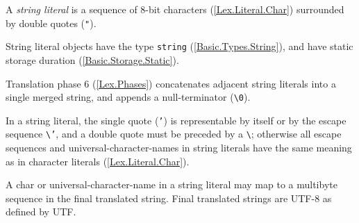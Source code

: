 \p A \textit{string literal} is a sequence of 8-bit characters
(\ref{Lex.Literal.Char}) surrounded by double quotes (\texttt{"}).

\p String literal objects have the type \texttt{string}
(\ref{Basic.Types.String}), and have static storage duration
(\ref{Basic.Storage.Static}).

\p Translation phase 6 (\ref{Lex.Phases}) concatenates adjacent string literals
into a single merged string, and appends a null-terminator (\texttt{\textbackslash 0}).

\p In a string literal, the single quote (\texttt{'}) is representable by itself
or by the escape sequence \texttt{\textbackslash '}, and a double quote must be preceded by a
\texttt{\textbackslash}; otherwise all escape sequences and universal-character-names in
string literals have the same meaning as in character literals
(\ref{Lex.Literal.Char}).

\p A char or universal-character-name in a string literal may map to a
multibyte sequence in the final translated string. Final translated strings are
UTF-8 as defined by \gls{UTF}.
